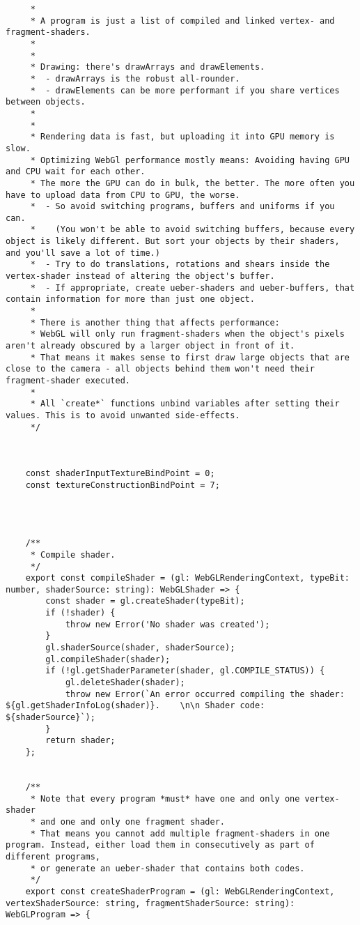 {\begin{lstlisting}
     *
     * A program is just a list of compiled and linked vertex- and fragment-shaders.
     *
     *
     * Drawing: there's drawArrays and drawElements.
     *  - drawArrays is the robust all-rounder.
     *  - drawElements can be more performant if you share vertices between objects.
     *
     *
     * Rendering data is fast, but uploading it into GPU memory is slow.
     * Optimizing WebGl performance mostly means: Avoiding having GPU and CPU wait for each other.
     * The more the GPU can do in bulk, the better. The more often you have to upload data from CPU to GPU, the worse.
     *  - So avoid switching programs, buffers and uniforms if you can.
     *    (You won't be able to avoid switching buffers, because every object is likely different. But sort your objects by their shaders, and you'll save a lot of time.)
     *  - Try to do translations, rotations and shears inside the vertex-shader instead of altering the object's buffer.
     *  - If appropriate, create ueber-shaders and ueber-buffers, that contain information for more than just one object.
     *
     * There is another thing that affects performance:
     * WebGL will only run fragment-shaders when the object's pixels aren't already obscured by a larger object in front of it.
     * That means it makes sense to first draw large objects that are close to the camera - all objects behind them won't need their fragment-shader executed.
     *
     * All `create*` functions unbind variables after setting their values. This is to avoid unwanted side-effects.
     */
    
    
    
    const shaderInputTextureBindPoint = 0;
    const textureConstructionBindPoint = 7;
    
    
    
    
    /**
     * Compile shader.
     */
    export const compileShader = (gl: WebGLRenderingContext, typeBit: number, shaderSource: string): WebGLShader => {
        const shader = gl.createShader(typeBit);
        if (!shader) {
            throw new Error('No shader was created');
        }
        gl.shaderSource(shader, shaderSource);
        gl.compileShader(shader);
        if (!gl.getShaderParameter(shader, gl.COMPILE_STATUS)) {
            gl.deleteShader(shader);
            throw new Error(`An error occurred compiling the shader: ${gl.getShaderInfoLog(shader)}.    \n\n Shader code: ${shaderSource}`);
        }
        return shader;
    };
    
    
    /**
     * Note that every program *must* have one and only one vertex-shader
     * and one and only one fragment shader.
     * That means you cannot add multiple fragment-shaders in one program. Instead, either load them in consecutively as part of different programs,
     * or generate an ueber-shader that contains both codes.
     */
    export const createShaderProgram = (gl: WebGLRenderingContext, vertexShaderSource: string, fragmentShaderSource: string): WebGLProgram => {
    

\end{lstlisting}}
